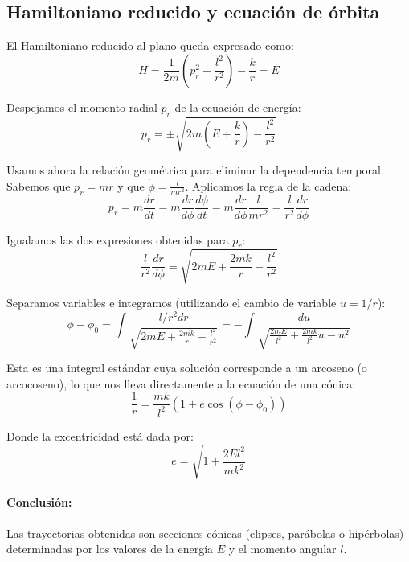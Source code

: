 \documentclass[12pt, a4paper]{article}
\begin{document}
\subsection*{Hamiltoniano reducido y ecuación de órbita}
El Hamiltoniano reducido al plano queda expresado como:
\begin{equation}
    H = \frac{1}{2m}\left( p_r^2 + \frac{l^2}{r^2} \right) - \frac{k}{r} = E
\end{equation}

Despejamos el momento radial $p_r$ de la ecuación de energía:
\begin{equation}
    p_r = \pm \sqrt{2m\left(E + \frac{k}{r}\right) - \frac{l^2}{r^2}}
\end{equation}

Usamos ahora la relación geométrica para eliminar la dependencia temporal. Sabemos que $p_r = m\dot{r}$ y que $\dot{\phi} = \frac{l}{mr^2}$. Aplicamos la regla de la cadena:
\begin{equation}
    p_r = m \frac{dr}{dt} = m \frac{dr}{d\phi} \frac{d\phi}{dt} = m \frac{dr}{d\phi} \frac{l}{mr^2} = \frac{l}{r^2} \frac{dr}{d\phi}
\end{equation}

Igualamos las dos expresiones obtenidas para $p_r$:
\begin{equation}
    \frac{l}{r^2} \frac{dr}{d\phi} = \sqrt{2mE + \frac{2mk}{r} - \frac{l^2}{r^2}}
\end{equation}

Separamos variables e integramos (utilizando el cambio de variable $u = 1/r$):
\begin{equation}
    \phi - \phi_0 = \int \frac{l/r^2 dr}{\sqrt{2mE + \frac{2mk}{r} - \frac{l^2}{r^2}}} = -\int \frac{du}{\sqrt{\frac{2mE}{l^2} + \frac{2mk}{l^2}u - u^2}}
\end{equation}

Esta es una integral estándar cuya solución corresponde a un arcoseno (o arcocoseno), lo que nos lleva directamente a la ecuación de una cónica:
\begin{equation}
    \frac{1}{r} = \frac{mk}{l^2} \left( 1 + e \cos(\phi - \phi_0) \right)
\end{equation}

Donde la excentricidad está dada por:
\begin{equation}
    e = \sqrt{1 + \frac{2El^2}{mk^2}}
\end{equation}

\paragraph{Conclusión:}
Las trayectorias obtenidas son secciones cónicas (elipses, parábolas o hipérbolas) determinadas por los valores de la energía $E$ y el momento angular $l$.
\end{document}

